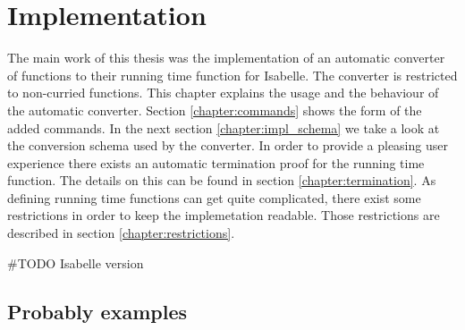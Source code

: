 
\chapter{Implementation}\label{chapter:impl}

The main work of this thesis was the implementation of an automatic converter of functions to their running time function for Isabelle.
The converter is restricted to non-curried functions.
This chapter explains the usage and the behaviour of the automatic converter.
Section \ref{chapter:commands} shows the form of the added commands.
In the next section \ref{chapter:impl_schema} we take a look at the conversion schema used by the converter.
In order to provide a pleasing user experience there exists an automatic termination proof for the running time function.
The details on this can be found in section \ref{chapter:termination}.
As defining running time functions can get quite complicated, there exist some restrictions in order to keep the implemetation readable.
Those restrictions are described in section \ref{chapter:restrictions}.

\#TODO Isabelle version






\section{Probably examples}
